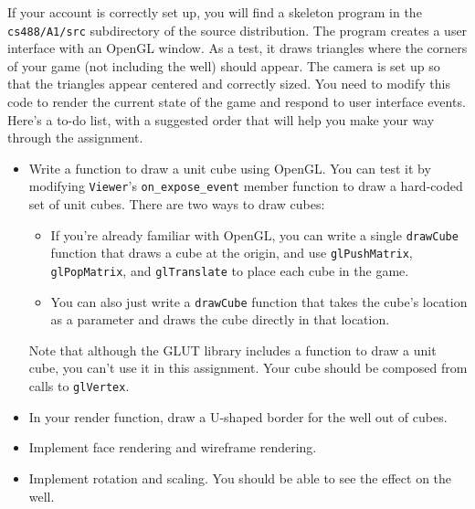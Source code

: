 If your account is correctly set up, you will find a skeleton
program in the \texttt{cs488/A1/src} subdirectory of the source
distribution.  The program creates a user interface
with an OpenGL window.   As a test, it draws triangles where the
corners of your game (not including the well) should appear.
The camera is set up so that the triangles appear centered and
correctly sized.
You need to modify this code to
render the current state of the game and respond to user interface
events.  Here's a to-do list, with a suggested order that will help
you make your way through the assignment.

\begin{itemize}
	\item Write a function to draw a unit cube using OpenGL.  You
		  can test it by modifying \texttt{Viewer}'s
                  \texttt{on\_\-expose\_\-event} member function to draw a hard-coded
		  set of unit cubes.  There are two ways to draw cubes:

		\begin{itemize}
		  \item If you're already familiar with OpenGL, you can write a
		  	single \texttt{drawCube} function that draws a cube at 
			the origin,
			  and use \texttt{glPushMatrix}, \texttt{glPopMatrix}, 
			and
			  \texttt{glTranslate} to place each cube in the game.
		  \item You can also just write a \texttt{drawCube} function
		  	that takes the cube's location as a parameter and draws
			the cube directly in that location.
		\end{itemize}

		Note that although the GLUT library includes a function to draw
		a unit cube, you can't use it in this assignment.  Your cube
		should be composed from calls to \texttt{glVertex}.

	\item In your render function, draw a U-shaped border for
	      the well out of cubes.

	\item Implement face rendering and wireframe
		  rendering.

	\item Implement rotation and scaling.  You should be
	      able to see the effect on the well.

\iffalse
	\item Implement single- and double-buffering.
		  You should be able to see the difference when rotating
		  the well.
\fi


\end{itemize}
